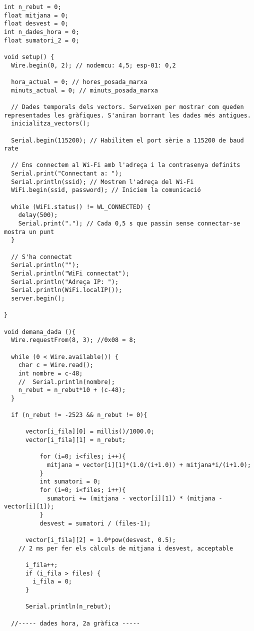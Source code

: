 \begin{lstlisting}[style=myArduino]
int n_rebut = 0;
float mitjana = 0;
float desvest = 0;
int n_dades_hora = 0;
float sumatori_2 = 0;

void setup() {
  Wire.begin(0, 2); // nodemcu: 4,5; esp-01: 0,2

  hora_actual = 0; // hores_posada_marxa
  minuts_actual = 0; // minuts_posada_marxa

  // Dades temporals dels vectors. Serveixen per mostrar com queden representades les gràfiques. S'aniran borrant les dades més antigues.
  inicialitza_vectors();

  Serial.begin(115200); // Habilitem el port sèrie a 115200 de baud rate

  // Ens connectem al Wi-Fi amb l'adreça i la contrasenya definits
  Serial.print("Connectant a: ");
  Serial.println(ssid); // Mostrem l'adreça del Wi-Fi
  WiFi.begin(ssid, password); // Iniciem la comunicació

  while (WiFi.status() != WL_CONNECTED) {
    delay(500);
    Serial.print("."); // Cada 0,5 s que passin sense connectar-se mostra un punt
  }

  // S'ha connectat
  Serial.println("");
  Serial.println("WiFi connectat");
  Serial.println("Adreça IP: ");
  Serial.println(WiFi.localIP());
  server.begin();

}

void demana_dada (){
  Wire.requestFrom(8, 3); //0x08 = 8;

  while (0 < Wire.available()) {
    char c = Wire.read(); 
    int nombre = c-48; 
    //  Serial.println(nombre);
    n_rebut = n_rebut*10 + (c-48);
  }

  if (n_rebut != -2523 && n_rebut != 0){
  
      vector[i_fila][0] = millis()/1000.0;
      vector[i_fila][1] = n_rebut;
      
          for (i=0; i<files; i++){
            mitjana = vector[i][1]*(1.0/(i+1.0)) + mitjana*i/(i+1.0);  
          }
          int sumatori = 0;
          for (i=0; i<files; i++){
            sumatori += (mitjana - vector[i][1]) * (mitjana - vector[i][1]);  
          }
          desvest = sumatori / (files-1);
  
      vector[i_fila][2] = 1.0*pow(desvest, 0.5);
    // 2 ms per fer els càlculs de mitjana i desvest, acceptable  
          
      i_fila++;
      if (i_fila > files) {
        i_fila = 0;
      }
   
      Serial.println(n_rebut);  
  
  //----- dades hora, 2a gràfica -----
  

\end{lstlisting}
